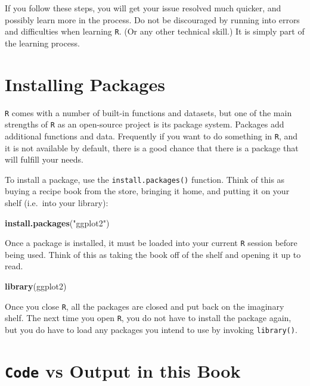 \documentclass[]{book}
\newenvironment{Shaded}{\begin{snugshade}}{\end{snugshade}}
\newcommand{\KeywordTok}[1]{\textcolor[rgb]{0.13,0.29,0.53}{\textbf{#1}}}
\newcommand{\NormalTok}[1]{#1}
\newcommand{\StringTok}[1]{\textcolor[rgb]{0.31,0.60,0.02}{#1}}
\begin{document}
If you follow these steps, you will get your issue resolved much quicker, and possibly learn more in the process. Do not be discouraged by running into errors and difficulties when learning \texttt{R}. (Or any other technical skill.) It is simply part of the learning process.

\hypertarget{installing-packages}{%
\section{Installing Packages}\label{installing-packages}}

\texttt{R} comes with a number of built-in functions and datasets, but one of the main strengths of \texttt{R} as an open-source project is its package system. Packages add additional functions and data. Frequently if you want to do something in \texttt{R}, and it is not available by default, there is a good chance that there is a package that will fulfill your needs.

To install a package, use the \texttt{install.packages()} function. Think of this as buying a recipe book from the store, bringing it home, and putting it on your shelf (i.e.~into your library):

\begin{Shaded}
\begin{Highlighting}[]
\KeywordTok{install.packages}\NormalTok{(}\StringTok{"ggplot2"}\NormalTok{)}
\end{Highlighting}
\end{Shaded}

Once a package is installed, it must be loaded into your current \texttt{R} session before being used. Think of this as taking the book off of the shelf and opening it up to read.

\begin{Shaded}
\begin{Highlighting}[]
\KeywordTok{library}\NormalTok{(ggplot2)}
\end{Highlighting}
\end{Shaded}

Once you close \texttt{R}, all the packages are closed and put back on the imaginary shelf. The next time you open \texttt{R}, you do not have to install the package again, but you do have to load any packages you intend to use by invoking \texttt{library()}.

\hypertarget{code-output}{%
\section{\texorpdfstring{\texttt{Code} vs Output in this Book}{Code vs Output in this Book}}\label{code-output}}
\end{document}
